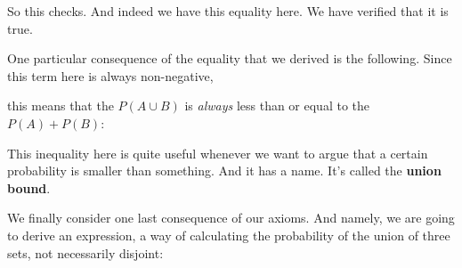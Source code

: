 \documentclass[pdftex, brazil, 12pt, twoside]{article}
\begin{document}
\begin{figure}[H]
  \begin{center}
  \end{center}
\end{figure}

So this checks.
And indeed we have this equality here.
We have verified that it is true.

One particular consequence of the equality that we derived
is the following.
Since this term here is always non-negative,

\begin{figure}[H]
  \begin{center}
  \end{center}
\end{figure}

this means that the $P(A \cup B)$ is \emph{always} less than or equal
to the $P(A) + P(B)$:

\begin{figure}[H]
  \begin{center}
  \end{center}
\end{figure}

This
inequality here is quite useful whenever we want to
argue that a certain probability is
smaller than something.
And it has a name.
It's called the \textbf{union bound}.

We finally consider one last consequence of our axioms.
And namely, we are going to derive an expression, a way of
calculating the probability of the union of three sets, not
necessarily disjoint:
\end{document}

